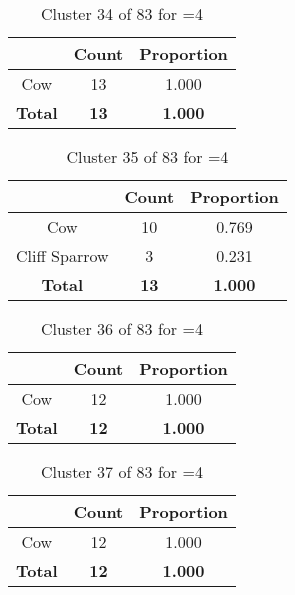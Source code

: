 \begin{table}[ht!]
\centering
\begin{tabular}{|c|c|c|}
\hline
\bf \Spec{} &\bf Count &\bf Proportion\\ \hline \hline
Cow & 13 & 1.000\\ \hline
\hline
\bf Total & \bf 13 & \bf 1.000\\ \hline
\end{tabular}
\label{tab:cluster:34:4}
\caption{Cluster 34 of 83 for \minneigh{}=4}
\end{table}

\begin{table}[ht!]
\centering
\begin{tabular}{|c|c|c|}
\hline
\bf \Spec{} &\bf Count &\bf Proportion\\ \hline \hline
Cow & 10 & 0.769\\ \hline
Cliff Sparrow & 3 & 0.231\\ \hline
\hline
\bf Total & \bf 13 & \bf 1.000\\ \hline
\end{tabular}
\label{tab:cluster:35:4}
\caption{Cluster 35 of 83 for \minneigh{}=4}
\end{table}

\begin{table}[ht!]
\centering
\begin{tabular}{|c|c|c|}
\hline
\bf \Spec{} &\bf Count &\bf Proportion\\ \hline \hline
Cow & 12 & 1.000\\ \hline
\hline
\bf Total & \bf 12 & \bf 1.000\\ \hline
\end{tabular}
\label{tab:cluster:36:4}
\caption{Cluster 36 of 83 for \minneigh{}=4}
\end{table}

\begin{table}[ht!]
\centering
\begin{tabular}{|c|c|c|}
\hline
\bf \Spec{} &\bf Count &\bf Proportion\\ \hline \hline
Cow & 12 & 1.000\\ \hline
\hline
\bf Total & \bf 12 & \bf 1.000\\ \hline
\end{tabular}
\label{tab:cluster:37:4}
\caption{Cluster 37 of 83 for \minneigh{}=4}
\end{table}

